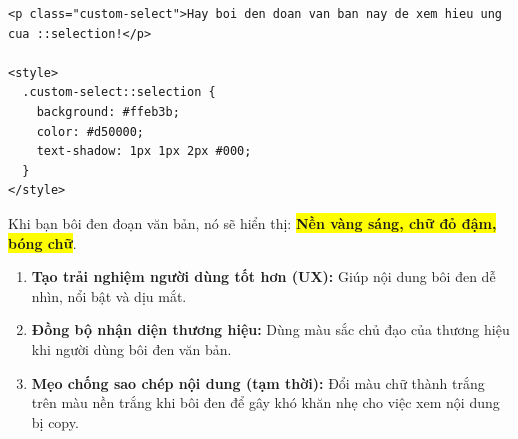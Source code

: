 \documentclass[11pt,oneside]{book}
\newcommand{\thd}[1]{\textcolor{white}{\textbf{\strut #1}}}
\newcommand{\codeinline}[1]{\textcolor{accentOrange}{\texttt{#1}}}
\begin{document}
\begin{codeWindow}
\begin{lstlisting}[language=HTML5]
<p class="custom-select">Hay boi den doan van ban nay de xem hieu ung cua ::selection!</p>

<style>
  .custom-select::selection {
    background: #ffeb3b;
    color: #d50000;
    text-shadow: 1px 1px 2px #000;
  }
</style>
\end{lstlisting}
\end{codeWindow}

\begin{browserWindow}
\sffamily\small
Khi bạn bôi đen đoạn văn bản, nó sẽ hiển thị: \colorbox{yellow}{\textcolor{red!80!black}{\textbf{Nền vàng sáng, chữ đỏ đậm, bóng chữ}}}.
\end{browserWindow}

\begin{prettyTableBox}
\sffamily\small
{}
\end{prettyTableBox}

\begin{conceptBox}
\begin{enumerate}[leftmargin=1.5em, itemsep=3pt, parsep=0pt]
    \item \textbf{Tạo trải nghiệm người dùng tốt hơn (UX):} Giúp nội dung bôi đen dễ nhìn, nổi bật và dịu mắt.
    \item \textbf{Đồng bộ nhận diện thương hiệu:} Dùng màu sắc chủ đạo của thương hiệu khi người dùng bôi đen văn bản.
    \item \textbf{Mẹo chống sao chép nội dung (tạm thời):} Đổi màu chữ thành trắng trên màu nền trắng khi bôi đen để gây khó khăn nhẹ cho việc xem nội dung bị copy.
\end{enumerate}
\end{conceptBox}
\end{document}
